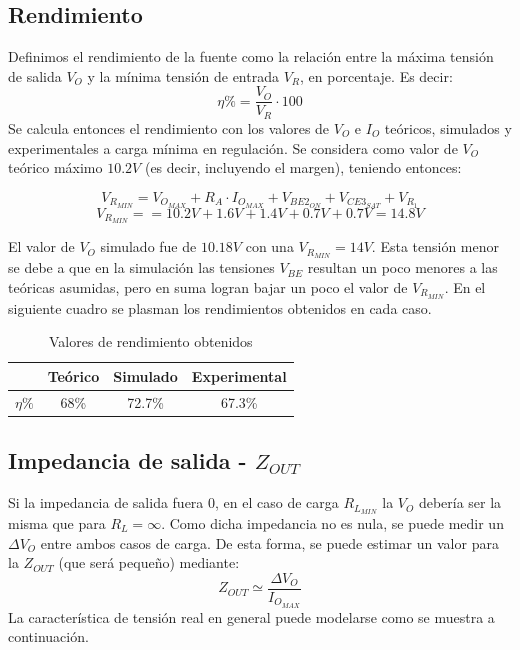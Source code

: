 \subsection{Rendimiento}

Definimos el rendimiento de la fuente como la relaci\'on entre la m\'axima tensi\'on de salida $V_O$ y la m\'inima tensi\'on de entrada $V_R$, en porcentaje. Es decir:
\[
\eta \% = \frac{V_O}{V_R} \cdot 100
\]
Se calcula entonces el rendimiento con los valores de $V_O$ e $I_O$ te\'oricos, simulados y experimentales a carga m\'inima en regulaci\'on.
Se considera como valor de $V_O$ te\'orico m\'aximo $10.2V$ (es decir, incluyendo el margen), teniendo entonces:

\[
V_{R_{MIN}} = V_{O_{MAX}} + R_A \cdot I_{O_{MAX}} + V_{BE2_{ON}} + V_{CE3_{SAT}} + V_{R_1}
\]
\[
V_{R_{MIN}} =  = 10.2V + 1.6V + 1.4V + 0.7V + 0.7V = 14.8V 
\]

\newpage

El valor de $V_O$ simulado fue de $10.18V$ con una $V_{R_{MIN}}= 14V$. Esta tensi\'on menor se debe a que en la simulaci\'on las tensiones $V_{BE}$ resultan un poco menores a las te\'oricas asumidas, pero en suma logran bajar un poco el valor de $V_{R_{MIN}}$. En el siguiente cuadro se plasman los rendimientos obtenidos en cada caso.

\begin{table}[!ht]
\begin{center}
\begin{tabular}{|c||c|c|c|}
\hline
& Te\'orico & Simulado & Experimental\\
\hline 
$\eta \%$ & 68\% & 72.7\% & 67.3\%\\
\hline 
\end{tabular}
\end{center}

\caption{Valores de rendimiento obtenidos}
\end{table}

\subsection{Impedancia de salida - $Z_{OUT}$}
 
Si la impedancia de salida fuera 0, en el caso de carga $R_{L_{MIN}}$ la $V_O$ deber\'ia ser la misma que para $R_L = \infty $. Como dicha impedancia no es nula, se puede medir un $\Delta V_O$ entre ambos casos de carga. De esta forma, se puede estimar un valor para la $Z_{OUT}$ (que ser\'a peque\~no) mediante:
\[
Z_{OUT} \simeq \frac{\Delta V_O}{I_{O_{MAX}}}   
\]
La caracter\'istica de tensi\'on real en general puede modelarse como se muestra a continuaci\'on.

